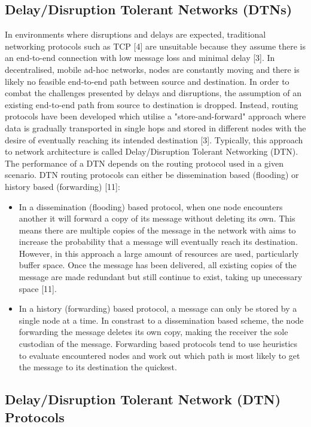 \documentclass{article}
\begin{document}
\subsection{Delay/Disruption Tolerant Networks (DTNs)}
In environments where disruptions and delays are expected, traditional networking protocols such as TCP [4] are unsuitable because they assume there is an end-to-end connection with low message loss and minimal delay [3]. In decentralised, mobile ad-hoc networks, nodes are constantly moving and there is likely no feasible end-to-end path between source and destination. In order to combat the challenges presented by delays and disruptions, the assumption of an existing end-to-end path from source to destination is dropped. Instead, routing protocols have been developed which utilise a "store-and-forward" approach where data is gradually transported in single hops and stored in different nodes with the desire of eventually reaching its intended destination [3]. Typically, this approach to network architecture is called Delay/Disruption Tolerant Networking (DTN).\\
\noindent The performance of a DTN depends on the routing protocol used in a given scenario. DTN routing protocols can either be dissemination based (flooding) or history based (forwarding) [11]:\\
\begin{itemize}
	\item In a dissemination (flooding) based protocol, when one node encounters another it will forward a copy of its message without deleting its own. This means there are multiple copies of the message in the network with aims to increase the probability that a message will eventually reach its destination. However, in this approach a large amount of resources are used, particularly buffer space. Once the message has been delivered, all existing copies of the message are made redundant but still continue to exist, taking up unecessary space [11].
	\item In a history (forwarding) based protocol, a message can only be stored by a single node at a time. In constrast to a dissemination based scheme, the node forwarding the message deletes its own copy, making the receiver the sole custodian of the message. Forwarding based protocols tend to use heuristics to evaluate encountered nodes and work out which path is most likely to get the message to its destination the quickest.
\end{itemize}
\newpage

\subsection{Delay/Disruption Tolerant Network (DTN) Protocols}
\end{document}
